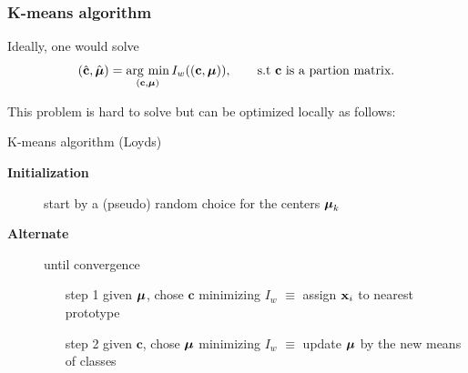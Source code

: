 \documentclass{beamer}\usepackage[]{graphicx}\usepackage[]{color}
\begin{document}
\begin{frame}
  \frametitle{K-means algorithm}
  
  Ideally, one would solve
  \begin{equation*}
    (\hat{\mathbf{c}}, \hat{\boldsymbol{\mu}}) = \mathop{\mathrm{arg\ min}}_{(\mathbf{c}, \boldsymbol{\mu})}  I_w((\mathbf{c}, \boldsymbol{\mu})), \qquad \text{s.t $\mathbf{c}$ is a partion matrix}.
  \end{equation*}
  
  This problem is hard to solve but can be optimized locally as follows:

  \vfill
  
  \begin{block}{K-means algorithm (Loyds)}
  \begin{description}
    \item[\textbf{Initialization}] start by a (pseudo) random choice for the centers $\boldsymbol{\mu}_k$
    \item[\textbf{Alternate}] until convergence
      \begin{enumerate}
        \item[step 1] given $\boldsymbol{\mu}$, chose $\mathbf{c}$ minimizing $I_w$ $\equiv$ assign $\mathbf{x}_i$ to nearest prototype
        \item[step 2] given $\mathbf{c}$, chose $\boldsymbol{\mu}$ minimizing $I_w$ $\equiv$ update $\boldsymbol{\mu}$ by the new means of classes
      \end{enumerate}
    \end{description}
  \end{block}

\end{frame}
\end{document}
